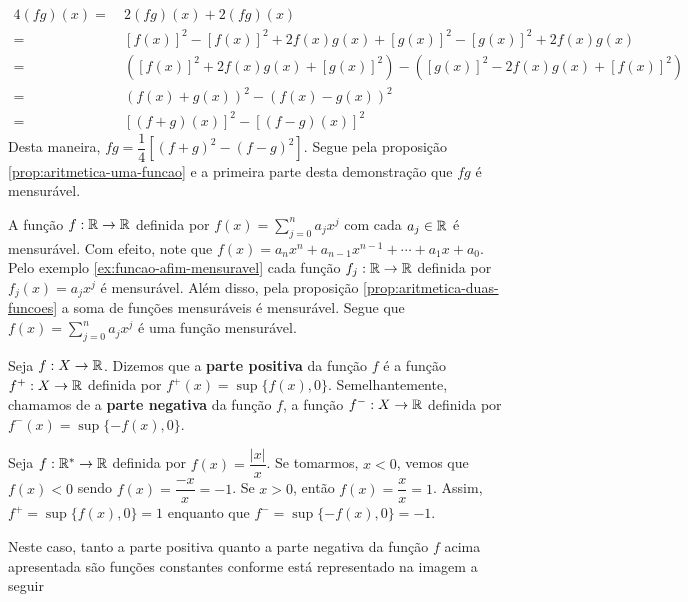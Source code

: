 \begin{prova}
    \begin{align*}
        4(fg)(x) 
        =& \ 2(fg)(x) +  2(fg)(x)\\
        =& \ [f(x)]^2 - [f(x)]^2 + 2f(x)g(x) + [g(x)]^2 - [g(x)]^2 + 2f(x)g(x)\\
        =& \ \left([f(x)]^2 + 2f(x)g(x) + [g(x)]^2\right)  - \left([g(x)]^2 - 2f(x)g(x) + [f(x)]^2\right)\\
        =& \ (f(x) +g(x))^2 - (f(x) - g(x))^2\\
        =& \ [(f+g)(x)]^2 - [(f-g)(x)]^2
    \end{align*}
    Desta maneira, $fg = \dfrac{1}{4}\left[(f+g)^2 - (f-g)^2\right]$. Segue pela proposição \ref{prop:aritmetica-uma-funcao} e a primeira parte desta demonstração que $fg$ é mensurável.
\end{prova}

\begin{example}
\label{ex:funcao-polinomial-mensuravel}
    A função  $f:\mathbb{R} \to \mathbb{R}$ definida por $f(x) = \sum_{j = 0}^n a_jx^j$ com cada $a_j \in \mathbb{R}$ é mensurável.
    Com efeito, note que  $f(x) = a_nx^n + a_{n-1}x^{n-1} + \cdots + a_1x +a_0$.
    Pelo exemplo \ref{ex:funcao-afim-mensuravel} cada função $f_j:\mathbb{R} \to \mathbb{R}$ definida por  $f_j(x) = a_jx^j$ é mensurável.
    Além disso, pela proposição \ref{prop:aritmetica-duas-funcoes} a soma de funções mensuráveis é mensurável.
    Segue que $f(x) = \sum_{j = 0}^n a_jx^j$ é uma função mensurável.
\end{example}


\begin{definition}
    Seja $f: X \to \mathbb{R}$. Dizemos que a \textbf{parte positiva} da função $f$ é a função $f^+: X \to \mathbb{R}$ definida por $f^+(x) = \sup\{f(x), 0\}$.
    Semelhantemente, chamamos de a \textbf{parte negativa} da função $f$, a função $f^-: X \to \mathbb{R}$ definida por $f^-(x) = \sup\{-f(x), 0\}$.
\end{definition}

\begin{example}
    Seja $f: \mathbb{R}^* \to \mathbb{R}$ definida por $f(x) =\dfrac{|x|}{x}$. Se tomarmos, $x< 0$, vemos que $f(x) < 0$ sendo $f(x) = \dfrac{-x}{x} = -1$.
    Se $x>0$, então $f(x) =\dfrac{x}{x} = 1$. Assim, $f^+ = \sup\{f(x), 0\} = 1$ enquanto que $f^- = \sup\{-f(x), 0\} = -1$.
\end{example}

Neste caso, tanto a parte positiva quanto a parte negativa da função $f$ acima apresentada são funções constantes
conforme está representado na imagem a seguir

